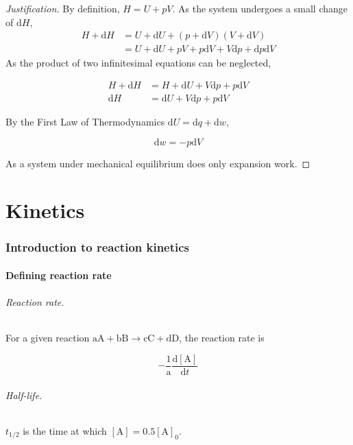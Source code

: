 \documentclass{article}
\numberwithin{theorem}{section}
\numberwithin{corollary}{section}
\numberwithin{postulate}{section}
\numberwithin{lemma}{section}
\numberwithin{definition}{section}
\newenvironment{justification} {\begin{proof}[Justification]} {\end{proof}}
\begin{document}
\begin{justification}
  By definition, $H = U + pV$. As the system undergoes a small change of $\mathrm{d}H$,
  \begin{equation*}
    \begin{split}
      H + \mathrm{d}H & = U + \mathrm{d}U + (p + \mathrm{d}V)(V + \mathrm{d}V) \\
      & = U + \mathrm{d}U + pV + p\mathrm{d}V + V\mathrm{d}p +
      \mathrm{d}p\mathrm{d}V
    \end{split}
  \end{equation*}
  As the product of two infinitesimal equations can be neglected,

  \begin{equation*}
    \begin{split}
      H + \mathrm{d}H & = H + \mathrm{d}U + V\mathrm{d}p + p\mathrm{d}V \\
      \mathrm{d}H & = \mathrm{d}U + V\mathrm{d}p + p\mathrm{d}V
    \end{split}
  \end{equation*}

  By the First Law of Thermodynamics $\mathrm{d}U = \mathrm{d}q + \mathrm{d}w$,

  \begin{equation*}
    \mathrm{d}w = -p\mathrm{d}V
  \end{equation*}

  As a system under mechanical equilibrium does only expansion work.


\end{justification}

\pagebreak
\part{Kinetics}

\section{Introduction to reaction kinetics}

\subsection{Defining reaction rate}

\paragraph{Reaction rate.} For a given reaction $\mathrm{aA} + \mathrm{bB}
\rightarrow \mathrm{cC} + \mathrm{dD}$, the reaction rate is

\begin{equation}
  -\frac{1}{\mathrm{a}} \frac{\mathrm{d[A]}}{\mathrm{d}t} 
\end{equation}

\paragraph{Half-life.} $t_{1/2}$ is the time at which $[\mathrm{A}] =
0.5[\mathrm{A}]_0$.
\end{document}
